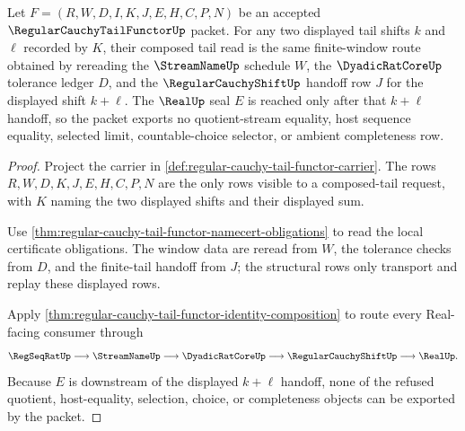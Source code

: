 \begin{theorem}
\label{thm:regular-cauchy-tail-functor-window-composition}
Let $F=(R,W,D,I,K,J,E,H,C,P,N)$ be an accepted $\RegularCauchyTailFunctorUp$ packet. For any two displayed tail shifts $k$ and $\ell$ recorded by $K$, their composed tail read is the same finite-window route obtained by rereading the $\StreamNameUp$ schedule $W$, the $\DyadicRatCoreUp$ tolerance ledger $D$, and the $\RegularCauchyShiftUp$ handoff row $J$ for the displayed shift $k+\ell$. The $\RealUp$ seal $E$ is reached only after that $k+\ell$ handoff, so the packet exports no quotient-stream equality, host sequence equality, selected limit, countable-choice selector, or ambient completeness row.
\end{theorem}
\begin{proof}
Project the carrier in \autoref{def:regular-cauchy-tail-functor-carrier}. The rows $R,W,D,K,J,E,H,C,P,N$ are the only rows visible to a composed-tail request, with $K$ naming the two displayed shifts and their displayed sum.

Use \autoref{thm:regular-cauchy-tail-functor-namecert-obligations} to read the local certificate obligations. The window data are reread from $W$, the tolerance checks from $D$, and the finite-tail handoff from $J$; the structural rows only transport and replay these displayed rows.

Apply \autoref{thm:regular-cauchy-tail-functor-identity-composition} to route every Real-facing consumer through
$$
\RegSeqRatUp \longrightarrow \StreamNameUp \longrightarrow \DyadicRatCoreUp \longrightarrow \RegularCauchyShiftUp \longrightarrow \RealUp .
$$
Because $E$ is downstream of the displayed $k+\ell$ handoff, none of the refused quotient, host-equality, selection, choice, or completeness objects can be exported by the packet.
\end{proof}


